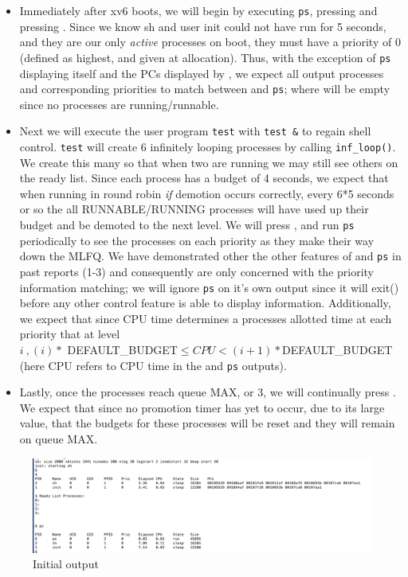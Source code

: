 \documentclass[11pt,letterpaper]{report}
\begin{document}
	\begin{itemize}
	
	\item Immediately after xv6 boots, we will begin by executing {\tt ps}, pressing  and pressing . Since we know sh and user init could not have run for 5 seconds,
		and they are our only \emph{active} processes on boot, they must have a priority of 0 (defined as highest, and given at allocation). Thus, with the exception of {\tt ps} displaying
		itself and the PCs displayed by , we expect all output processes and corresponding priorities to match between  and {\tt ps}; where  will be empty since no processes
		are running/runnable.
	\item Next we will execute the user program {\tt test} with {\tt test \&} to regain shell control. {\tt test} will create 6 infinitely looping processes by calling {\tt inf\_loop()}. We 
		create this many so that when two are running we may still see others on the ready list. Since each process
		has a budget of 4 seconds, we expect that when running in round robin \emph{if} demotion occurs correctly, every 6*5 seconds or so the all RUNNABLE/RUNNING processes will have used up their budget 
		and be demoted to the next level. We will press ,  and run {\tt ps} periodically to see the processes on each priority as they make their way down the MLFQ. We have 
		demonstrated other the other features of  and {\tt ps} in past reports (1-3) and consequently are only concerned with the priority information matching; we will ignore {\tt ps} on it's own output since 
		it will exit() before any other control feature is able to display information. Additionally,
		we expect that since CPU time determines a processes allotted time at each priority that at level \\ $i\ , (i) *$ DEFAULT\_BUDGET$ \leq CPU < (i+1) * $DEFAULT\_BUDGET (here
		CPU refers to CPU time in the  and {\tt ps} outputs).
	\item Lastly, once the processes reach queue MAX, or 3, we will continually press . We expect that since no promotion timer has yet to occur, due to its large value, that the budgets
		for these processes will be reset and they will remain on queue MAX.
	\end{itemize}

\newpage
	
\begin{figure}[h]
\centering
\includegraphics[width=0.6\linewidth]{demotion-start.png}
\caption{Initial output}
\label{fig:0}
\end{figure}
\end{document}
